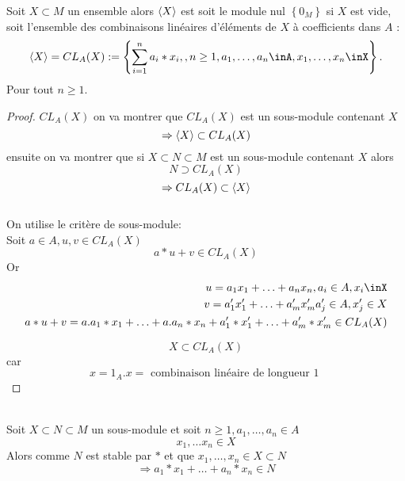 \documentclass[../main.tex]{subfiles}
\begin{document}
\begin{thm}
	Soit $X\subset M$ un ensemble alors $\left\langle X\right\rangle$ est soit le module nul $ \left\{ 0_M \right\} $ si $X$ est vide, soit l'ensemble des combinaisons linéaires d'éléments de $X$ à coefficients dans $A$ :
	\[ 
		\eng{X} = CL_A(X) := \left\{ \sum_{i=1}^{ n}a_i \ast x_i,, n\geq 1, a_1,\ldots,a_n \inA, x_1,\ldots,x_n \inX \right\} .
	\]
	Pour tout $n\geq 1$.
	
\end{thm}
\begin{proof}
	$CL_A(X)$ on va montrer que $CL_A(X)$ est un sous-module contenant $X$ 
	\[ 
		\Rightarrow \left\langle X\right\rangle \subset CL_A(X)
	\]
	ensuite on va montrer que si $X\subset N \subset M$ est un sous-module contenant $X$ alors
	\[ 
		N \supset CL_A(X)
	\]
	\[ 
		\Rightarrow CL_A(X) \subset \left\langle X\right\rangle
	\]
\hr\\
On utilise le critère de sous-module:\\
Soit $a \in A, u,v \in CL_A(X)$
\[ 
	a\ast u + v \in CL_A(X)
\]
Or
\begin{align*}
u= a_1x_1+ \ldots + a_n x_n, a_i \in  A, x_i \inX\\
v= a'_1x'_1+ \ldots + a'_m x'_m a'_j \in A, x'_j \in X\\
a\ast u +v = a.a_1\ast x_1 + \ldots + a.a_n\ast x_n + a'_1 \ast x'_1 + \ldots + a'_m \ast x'_m \in CL_{A} ( X)
\end{align*}

\[ 
	X\subset CL_A(X)
\]
car 
\[ 
x=1_A. x = \text{ combinaison linéaire de longueur 1 } 
\]

\end{proof}


\hr\\
Soit $X\subset N\subset M$ un sous-module et soit $n\geq 1, a_1,\ldots,a_n \in A$
\[ 
x_1,\ldots x_n\in X
\]
Alors comme $N$ est stable par $\ast$ et que $x_1,\ldots,x_n\in X \subset N$ 
\[ 
\Rightarrow a_1\ast x_1 + \ldots + a_n \ast x_n \in N
\]
\end{document}
